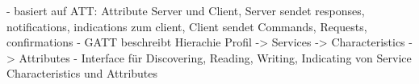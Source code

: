 - basiert auf ATT: Attribute Server und Client, Server sendet responses, notifications, indications zum client, Client sendet Commands, Requests, confirmations
- GATT beschreibt Hierachie Profil -> Services -> Characteristics -> Attributes
- Interface für Discovering, Reading, Writing, Indicating von Service Characteristics und Attributes